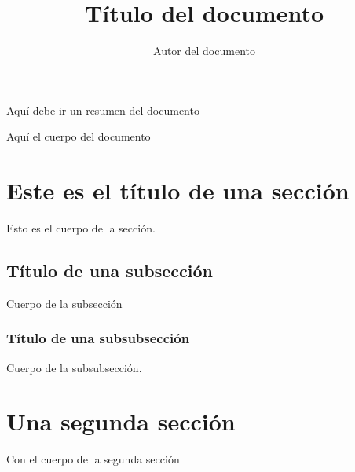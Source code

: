 \documentclass{hxc_cl}
\begin{document}
\title{Título del documento}
\author{Autor del documento}
\date{}
\maketitle
\begin{resumen}
Aquí debe ir un resumen del documento
\end{resumen}

Aquí el cuerpo del documento

\section{Este es el título de una sección}
Esto es el cuerpo de la sección.

\subsection{Título de una subsección}
Cuerpo de la subsección

\subsubsection{Título de una subsubsección}
Cuerpo de la subsubsección.

\section{Una segunda sección}
Con el cuerpo de la segunda sección
\end{document}
